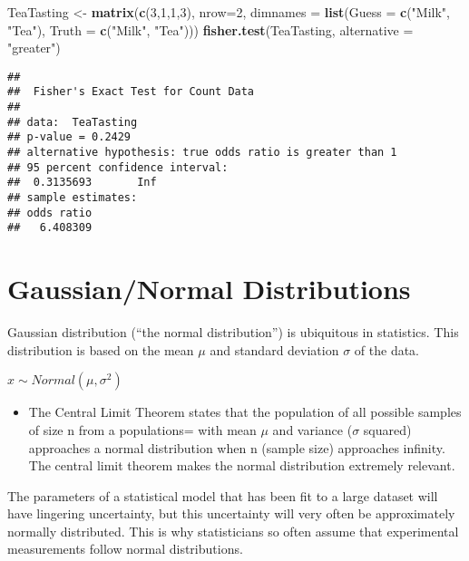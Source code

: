 \documentclass[
]{article}
\newenvironment{Shaded}{\begin{snugshade}}{\end{snugshade}}
\newcommand{\DataTypeTok}[1]{\textcolor[rgb]{0.13,0.29,0.53}{#1}}
\newcommand{\DecValTok}[1]{\textcolor[rgb]{0.00,0.00,0.81}{#1}}
\newcommand{\KeywordTok}[1]{\textcolor[rgb]{0.13,0.29,0.53}{\textbf{#1}}}
\newcommand{\NormalTok}[1]{#1}
\newcommand{\StringTok}[1]{\textcolor[rgb]{0.31,0.60,0.02}{#1}}
\providecommand{\tightlist}{%
  \setlength{\itemsep}{0pt}\setlength{\parskip}{0pt}}
\begin{document}
\begin{Shaded}
\begin{Highlighting}[]
\NormalTok{TeaTasting <-}
\StringTok{  }\KeywordTok{matrix}\NormalTok{(}\KeywordTok{c}\NormalTok{(}\DecValTok{3}\NormalTok{,}\DecValTok{1}\NormalTok{,}\DecValTok{1}\NormalTok{,}\DecValTok{3}\NormalTok{), }
         \DataTypeTok{nrow=}\DecValTok{2}\NormalTok{, }
         \DataTypeTok{dimnames =} \KeywordTok{list}\NormalTok{(}\DataTypeTok{Guess =} \KeywordTok{c}\NormalTok{(}\StringTok{"Milk"}\NormalTok{, }\StringTok{"Tea"}\NormalTok{), }
                         \DataTypeTok{Truth =} \KeywordTok{c}\NormalTok{(}\StringTok{"Milk"}\NormalTok{, }\StringTok{"Tea"}\NormalTok{)))}
\KeywordTok{fisher.test}\NormalTok{(TeaTasting, }\DataTypeTok{alternative =} \StringTok{"greater"}\NormalTok{)}
\end{Highlighting}
\end{Shaded}

\begin{verbatim}
## 
##  Fisher's Exact Test for Count Data
## 
## data:  TeaTasting
## p-value = 0.2429
## alternative hypothesis: true odds ratio is greater than 1
## 95 percent confidence interval:
##  0.3135693       Inf
## sample estimates:
## odds ratio 
##   6.408309
\end{verbatim}

\hypertarget{gaussiannormal-distributions}{%
\section{Gaussian/Normal
Distributions}\label{gaussiannormal-distributions}}

Gaussian distribution (``the normal distribution'') is ubiquitous in
statistics. This distribution is based on the mean \(\mu\) and standard
deviation \(\sigma\) of the data.

\(x \sim Normal(\mu, \sigma^2)\)

\begin{itemize}
\tightlist
\item
  The Central Limit Theorem states that the population of all possible
  samples of size n from a populations= with mean \(\mu\) and variance
  (\(\sigma\) squared) approaches a normal distribution when n (sample
  size) approaches infinity. The central limit theorem makes the normal
  distribution extremely relevant.
\end{itemize}

The parameters of a statistical model that has been fit to a large
dataset will have lingering uncertainty, but this uncertainty will very
often be approximately normally distributed. This is why statisticians
so often assume that experimental measurements follow normal
distributions.
\end{document}
